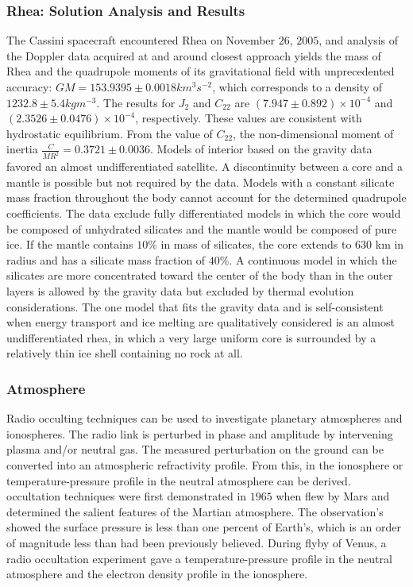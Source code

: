 \documentclass{article}
\begin{document}
            \subsubsection{\footnotesize Rhea: Solution Analysis and Results}
            
            The Cassini spacecraft encountered Rhea on November $26$, $2005$, and analysis of the Doppler data acquired at and around closest approach yields the mass of Rhea and the \gls{quadrupole} moments of its \gls{gravitational field} with unprecedented accuracy: $GM=153.9395\pm 0.0018 km^{3}s^{-2}$, which corresponds to a density of $1232.8\pm 5.4
            kg m^{-3}$. The results for $J_{2}$ and $C_{22}$ are $(7.947\pm 0.892)\times 10^{-4}$ and $(2.3526\pm 0.0476)\times 10^{-4}$, respectively. These values are consistent with \gls{hydrostatic} equilibrium. From the value of $C_{22}$, the non-dimensional moment of inertia $\frac{C}{MR^{2}} = 0.3721 \pm 0.0036$. Models of  interior based on the gravity data favored an almost undifferentiated satellite. A discontinuity between a core and a mantle is possible but not required by the data. Models with a constant silicate mass fraction throughout the body cannot account for the determined \gls{quadrupole} coefficients. The data exclude fully differentiated models in which the core would be composed of unhydrated silicates and the mantle would be
            composed of pure ice. If the mantle contains $10\%$ in mass of silicates, the core extends to
            630 km in radius and has a silicate mass fraction of $40\%$. A continuous model in which
            the silicates are more concentrated toward the center of the body than in the outer layers is allowed by the gravity data but excluded by thermal evolution considerations. The one model that fits the gravity data and is self-consistent when energy transport and ice melting are qualitatively considered is an almost undifferentiated \gls{rhea}, in which a very large uniform core is surrounded by a relatively thin ice shell containing no rock at all.
            \subsubsection{Atmosphere}
            Radio occulting techniques can be used to investigate planetary \glspl{atmosphere} and \glspl{ionosphere}. The radio link is perturbed in \gls{phase} and \gls{amplitude} by intervening \gls{plasma} and/or neutral gas. The measured perturbation on the ground can be converted into an atmospheric refractivity profile. From this,  in the \gls{ionosphere} or \gls{temperature-pressure profile} in the \gls{neutral atmosphere} can be derived. \Gls{occultation} techniques were first demonstrated in $1965$ when  flew by Mars and determined the salient features of the Martian \gls{atmosphere}. The observation's showed the surface pressure is less than one percent of Earth's, which is an order of magnitude less than had been previously believed. During  flyby of Venus, a radio \gls{occultation} experiment gave a \gls{temperature-pressure profile} in the \gls{neutral atmosphere} and the \gls{electron density profile} in the ionosphere. 
\end{document}
